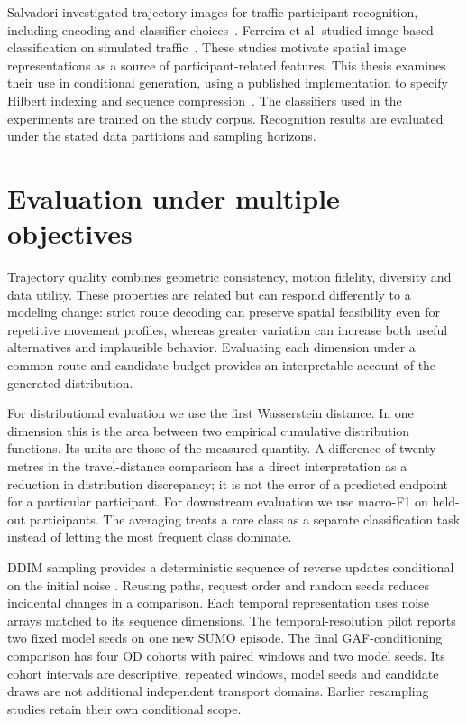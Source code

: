 Salvadori investigated trajectory images for traffic participant recognition, including encoding and classifier choices~\cite{salvadori}. Ferreira et al. studied image-based classification on simulated traffic~\cite{ferreira}. These studies motivate spatial image representations as a source of participant-related features. This thesis examines their use in conditional generation, using a published implementation to specify Hilbert indexing and sequence compression~\cite{original}. The classifiers used in the experiments are trained on the study corpus. Recognition results are evaluated under the stated data partitions and sampling horizons.

\section{Evaluation under multiple objectives}
Trajectory quality combines geometric consistency, motion fidelity, diversity and data utility. These properties are related but can respond differently to a modeling change: strict route decoding can preserve spatial feasibility even for repetitive movement profiles, whereas greater variation can increase both useful alternatives and implausible behavior. Evaluating each dimension under a common route and candidate budget provides an interpretable account of the generated distribution.

For distributional evaluation we use the first Wasserstein distance. In one dimension this is the area between two empirical cumulative distribution functions. Its units are those of the measured quantity. A difference of twenty metres in the travel-distance comparison has a direct interpretation as a reduction in distribution discrepancy; it is not the error of a predicted endpoint for a particular participant. For downstream evaluation we use macro-F1 on held-out participants. The averaging treats a rare class as a separate classification task instead of letting the most frequent class dominate.

DDIM sampling provides a deterministic sequence of reverse updates conditional on the initial noise \cite{ddim}. Reusing paths, request order and random seeds reduces incidental changes in a comparison. Each temporal representation uses noise arrays matched to its sequence dimensions. The temporal-resolution pilot reports two fixed model seeds on one new SUMO episode. The final GAF-conditioning comparison has four OD cohorts with paired windows and two model seeds. Its cohort intervals are descriptive; repeated windows, model seeds and candidate draws are not additional independent transport domains. Earlier resampling studies retain their own conditional scope.

